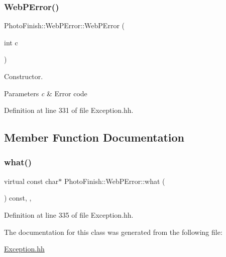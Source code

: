 \subsubsection{\texorpdfstring{Web\+P\+Error()}{WebPError()}}
{\footnotesize\ttfamily Photo\+Finish\+::\+Web\+P\+Error\+::\+Web\+P\+Error (\begin{DoxyParamCaption}\item[{int}]{c }\end{DoxyParamCaption})\hspace{0.3cm}{\ttfamily [inline]}}



Constructor. 


\begin{DoxyParams}{Parameters}
{\em c} & Error code \\
\hline
\end{DoxyParams}


Definition at line 331 of file Exception.\+hh.



\subsection{Member Function Documentation}
\mbox{\label{class_photo_finish_1_1_web_p_error_a1db4a07a927d2323ef499b3d84f1b42d}} 
\subsubsection{\texorpdfstring{what()}{what()}}
{\footnotesize\ttfamily virtual const char$\ast$ Photo\+Finish\+::\+Web\+P\+Error\+::what (\begin{DoxyParamCaption}{ }\end{DoxyParamCaption}) const\hspace{0.3cm}{\ttfamily [inline]}, {\ttfamily [virtual]}, {\ttfamily [noexcept]}}



Definition at line 335 of file Exception.\+hh.



The documentation for this class was generated from the following file\+:\begin{DoxyCompactItemize}
\item 
\hyperlink{_exception_8hh}{Exception.\+hh}\end{DoxyCompactItemize}
